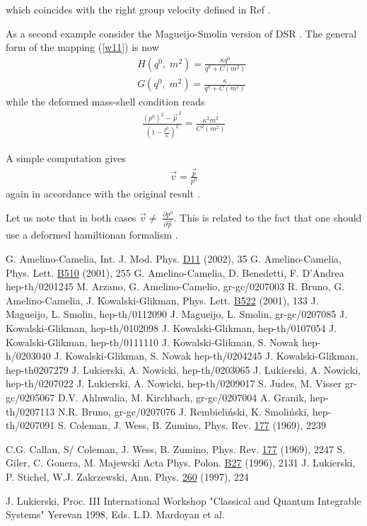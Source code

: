 \documentclass[a4paper,12pt]{article}
\begin{document}
which coincides with the right group velocity defined in Ref \cite{b15}. 

As a second example consider the Magueijo-Smolin version of DSR \cite{b6}. 
The general form of the mapping (\ref{w11}) is now
\begin{eqnarray}
&&H(q^0,\;m^2)=\frac{\kappa q^0}{q^0+C(m^2)} \nonumber \\
&&G(q^0,\;m^2)=\frac{\kappa}{q^0+C(m^2)}\label{w18}
\end{eqnarray}
while the deformed mass-shell condition reads
\begin{eqnarray}
\frac{(p^0)^2-\vec{p}^{\;2}}{(1-\frac{p^0}{\kappa})^2}=\frac{\kappa^2m^2}{C^2(m^2)}\label{w19}
\end{eqnarray}

A simple computation gives  
\begin{eqnarray}
\vec{v}=\frac{\vec{p}}{{p^0}}\label{w20}
\end{eqnarray}
again in accordance with the original result \cite{b6}.

Let us note that in both cases $\vec{v} \ne \;\frac{\partial p^0}{\partial \vec{p}}$. This is related to the fact that
one should use a deformed hamiltionan formalism \cite{b24}.

\begin{thebibliography}{99}
G. Amelino-Camelia, Int. J. Mod. Phys. \underline{D11} (2002), 35
G. Amelino-Camelia, Phys. Lett. \underline{B510} (2001), 255
G. Amelino-Camelia, D. Benedetti, F. D'Andrea hep-th/0201245
M. Arzano, G. Amelino-Camelio, gr-gc/0207003
R. Bruno, G. Amelino-Camelia, J. Kowalski-Glikman, Phys. Lett. \underline{B522} (2001), 133
J. Magueijo, L. Smolin, hep-th/0112090
J. Magueijo, L. Smolin, gr-gc/0207085
J. Kowalski-Glikman, hep-th/0102098
J. Kowalski-Glikman, hep-th/0107054
J. Kowalski-Glikman, hep-th/0111110
J. Kowalski-Glikman, S. Nowak hep-h/0203040
J. Kowalski-Glikman, S. Nowak hep-th/0204245
J. Kowalski-Glikman, hep-th0207279
J. Lukierski, A. Nowicki, hep-th/0203065
J. Lukierski, A. Nowicki, hep-th/0207022
J. Lukierski, A. Nowicki, hep-th/0209017
S. Judes, M. Visser gr-gc/0205067
D.V. Ahluwalia, M. Kirchbach, gr-gc/0207004
A. Granik, hep-th/0207113
N.R. Bruno, gr-gc/0207076
J. Rembieli\'nski, K. Smoli\'nski, hep-th/0207091
S. Coleman, J. Wess, B. Zumino, Phys. Rev. \underline{177} (1969), 2239

C.G. Callan, S/ Coleman, J. Wess, B. Zumino, Phys. Rev. \underline{177} (1969), 2247
S. Giler, C. Gonera, M. Majewski Acta Phys. Polon. \underline{B27} (1996), 2131
J. Lukierski, P. Stichel, W.J. Zakrzewski, Ann. Phys. \underline{260} (1997), 224

J. Lukierski, Proc. III International Workshop "Classical and Quantum Integrable Systems" Yerevan 1998, Eds. L.D.
 Mardoyan et al.
\end{thebibliography}
\end{document}
